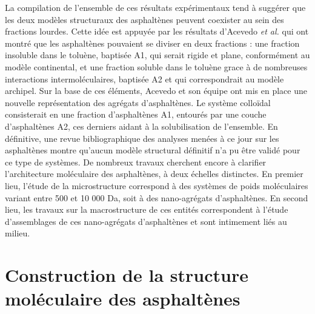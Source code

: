 	La compilation de l'ensemble de ces résultats expérimentaux tend à suggérer que les deux modèles structuraux des asphaltènes peuvent coexister au sein des fractions lourdes. Cette idée est appuyée par les résultats d'Acevedo \textit{et al.} \cite{acevedo2004structural, gutierrez2001fractionation} qui ont montré que les asphaltènes pouvaient se diviser en deux fractions : une fraction insoluble dans le toluène, baptisée A1, qui serait rigide et plane, conformément au modèle continental, et une fraction soluble dans le toluène grace à de nombreuses interactions intermoléculaires, baptisée A2 et qui correspondrait au modèle archipel. Sur la base de ces éléments, Acevedo et son équipe ont mis en place une nouvelle représentation des agrégats d'asphaltènes. Le système colloïdal consisterait en une fraction d'asphaltènes A1, entourés par une couche d'asphaltènes A2, ces derniers aidant à la solubilisation de l'ensemble. 
	En définitive, une revue bibliographique des analyses menées à ce jour sur les asphaltènes montre qu'aucun modèle structural définitif n'a pu être validé pour ce type de systèmes. De nombreux travaux cherchent encore à clarifier l'architecture moléculaire des asphaltènes, à deux échelles distinctes. En premier lieu, l'étude de la microstructure correspond à des systèmes de poids moléculaires variant entre 500 et 10 000 Da, soit à des nano-agrégats d'asphaltènes. En second lieu, les travaux sur la macrostructure de ces entités correspondent à l'étude d'assemblages de ces nano-agrégats d'asphaltènes et sont intimement liés au milieu. 
	
	
	\bigskip
	
	\section{Construction de la structure moléculaire des asphaltènes}
	
